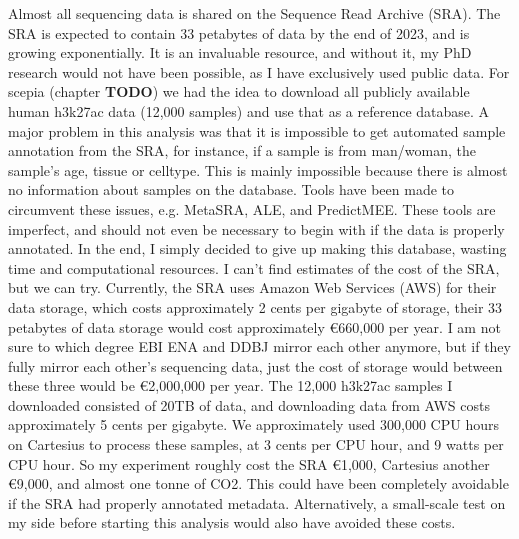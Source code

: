 Almost all sequencing data is shared on the Sequence Read Archive (SRA). The SRA is expected to contain 33 petabytes of data by the end of 2023, and is growing exponentially\cite{srawebsite,Katz2021}. It is an invaluable resource, and without it, my PhD research would not have been possible, as I have exclusively used public data. For scepia (chapter \textbf{TODO}) we had the idea to download all publicly available human h3k27ac data (12,000 samples) and use that as a reference database. A major problem in this analysis was that it is impossible to get automated sample annotation from the SRA, for instance, if a sample is from man/woman, the sample's age, tissue or celltype. This is mainly impossible because there is almost no information about samples on the database. Tools have been made to circumvent these issues, e.g. MetaSRA, ALE, and PredictMEE. These tools are imperfect, and should not even be necessary to begin with if the data is properly annotated. In the end, I simply decided to give up making this database, wasting time and computational resources. I can't find estimates of the cost of the SRA, but we can try. Currently, the SRA uses Amazon Web Services (AWS) for their data storage, which costs approximately 2 cents per gigabyte of storage\cite{amazon}, their 33 petabytes of data storage would cost approximately €660,000 per year. I am not sure to which degree EBI ENA and DDBJ mirror each other anymore, but if they fully mirror each other's sequencing data, just the cost of storage would between these three would be €2,000,000 per year. The 12,000 h3k27ac samples I downloaded consisted of 20TB of data, and downloading data from AWS costs approximately 5 cents per gigabyte\cite{amazon}.  We approximately used 300,000 CPU hours on Cartesius to process these samples, at 3 cents per CPU hour\cite{cartesius}, and 9 watts per CPU hour\cite{intelxeon}.
So my experiment roughly cost the SRA €1,000, Cartesius another €9,000, and almost one tonne of CO2\cite{CO2}. This could have been completely avoidable if the SRA had properly annotated metadata. Alternatively, a small-scale test on my side before starting this analysis would also have avoided these costs.

